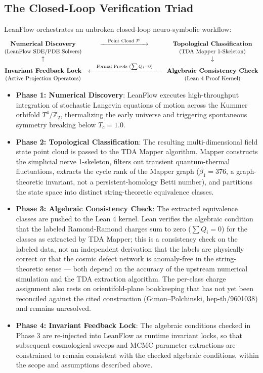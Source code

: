 \documentclass[11pt,a4paper]{article}
\newcommand{\numreconcile}[2]{#1}
\begin{document}
\subsection{The Closed-Loop Verification Triad}
LeanFlow orchestrates an unbroken closed-loop neuro-symbolic workflow:
\begin{equation}
\begin{matrix}
\textbf{Numerical Discovery} & \xrightarrow{\quad \text{Point Cloud } \mathcal{P} \quad} & \textbf{Topological Classification} \\
\text{\small (LeanFlow SDE/PDE Solvers)} & & \text{\small (TDA Mapper 1-Skeleton)} \\
\uparrow & & \downarrow \\
\textbf{Invariant Feedback Lock} & \xleftarrow{\quad \text{Formal Proofs } (\sum Q_i = 0) \quad} & \textbf{Algebraic Consistency Check} \\
\text{\small (Active Projection Operators)} & & \text{\small (Lean 4 Proof Kernel)}
\end{matrix}
\end{equation}
\begin{itemize}
    \item \textbf{Phase 1: Numerical Discovery}: LeanFlow executes high-throughput integration of stochastic Langevin equations of motion across the Kummer orbifold $T^4/\mathbb{Z}_2$, thermalizing the early universe and triggering spontaneous symmetry breaking below $T_c = 1.0$.
    \item \textbf{Phase 2: Topological Classification}: The resulting multi-dimensional field state point cloud is passed to the TDA Mapper algorithm. Mapper constructs the simplicial nerve 1-skeleton, filters out transient quantum-thermal fluctuations, extracts the cycle rank of the Mapper graph ($\beta_1 = \numreconcile{376}{\text{Mapper graph cycle rank}}$, a graph-theoretic invariant, not a persistent-homology Betti number), and partitions the state space into distinct string-theoretic equivalence classes.
    \item \textbf{Phase 3: Algebraic Consistency Check}: The extracted equivalence classes are pushed to the Lean 4 kernel. Lean verifies the algebraic condition that the labeled Ramond-Ramond charges sum to zero ($\sum Q_i = 0$) for the classes as extracted by TDA Mapper; this is a consistency check on the labeled data, not an independent derivation that the labels are physically correct or that the cosmic defect network is anomaly-free in the string-theoretic sense — both depend on the accuracy of the upstream numerical simulation and the TDA extraction algorithm. The per-class charge assignment also rests on orientifold-plane bookkeeping that has not yet been reconciled against the cited construction (Gimon--Polchinski, hep-th/9601038) and remains unresolved.
    \item \textbf{Phase 4: Invariant Feedback Lock}: The algebraic conditions checked in Phase 3 are re-injected into LeanFlow as runtime invariant locks, so that subsequent cosmological sweeps and MCMC parameter extractions are constrained to remain consistent with the checked algebraic conditions, within the scope and assumptions described above.
\end{itemize}
\end{document}
